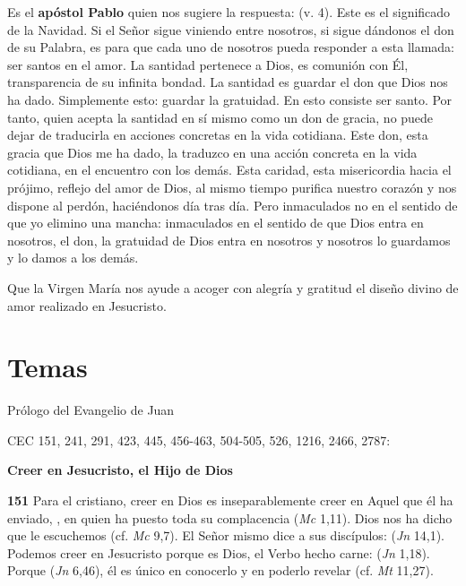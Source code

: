 \begin{body}
\begin{body}
Es el \textbf{apóstol Pablo} quien nos sugiere la respuesta:  (v. 4). Este es el significado de la Navidad. Si el Señor sigue viniendo entre nosotros, si sigue dándonos el don de su Palabra, es para que cada uno de nosotros pueda responder a esta llamada: ser santos en el amor. La santidad pertenece a Dios, es comunión con Él, transparencia de su infinita bondad. La santidad es guardar el don que Dios nos ha dado. Simplemente esto: guardar la gratuidad. En esto consiste ser santo. Por tanto, quien acepta la santidad en sí mismo como un don de gracia, no puede dejar de traducirla en acciones concretas en la vida cotidiana. Este don, esta gracia que Dios me ha dado, la traduzco en una acción concreta en la vida cotidiana, en el encuentro con los demás. Esta caridad, esta misericordia hacia el prójimo, reflejo del amor de Dios, al mismo tiempo purifica nuestro corazón y nos dispone al perdón, haciéndonos  día tras día. Pero inmaculados no en el sentido de que yo elimino una mancha: inmaculados en el sentido de que Dios entra en nosotros, el don, la gratuidad de Dios entra en nosotros y nosotros lo guardamos y lo damos a los demás.

Que la Virgen María nos ayude a acoger con alegría y gratitud el diseño divino de amor realizado en Jesucristo.



\section{Temas}

Prólogo del Evangelio de Juan

CEC 151, 241, 291, 423, 445, 456-463, 504-505, 526, 1216, 2466, 2787:

\textbf{Creer en Jesucristo, el Hijo de Dios}

\textbf{151} Para el cristiano, creer en Dios es inseparablemente creer en Aquel que él ha enviado, , en quien ha puesto toda su complacencia (\emph{Mc} 1,11). Dios nos ha dicho que le escuchemos (cf. \emph{Mc} 9,7). El Señor mismo dice a sus discípulos:  (\emph{Jn} 14,1). Podemos creer en Jesucristo porque es Dios, el Verbo hecho carne:  (\emph{Jn} 1,18). Porque  (\emph{Jn} 6,46), él es único en conocerlo y en poderlo revelar (cf. \emph{Mt} 11,27).


\end{body}
\end{body}
